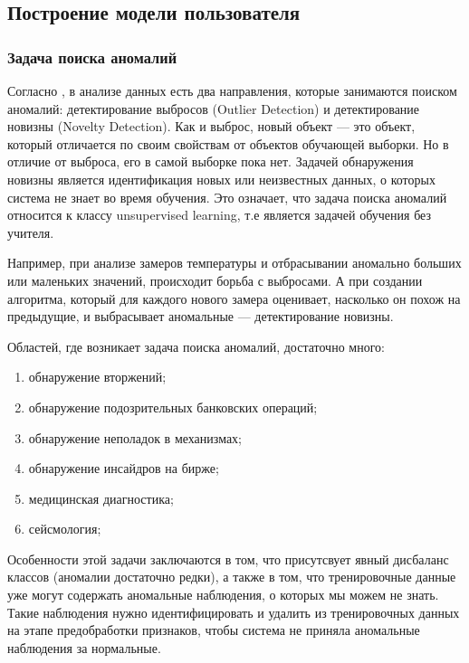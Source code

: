 \documentclass[12pt]{article}
\begin{document}
    \subsection{Построение модели пользователя}
    \label{sec:Research:Model}

    \subsubsection{Задача поиска аномалий}
    \label{sec:Research:Model:Anomaly}

    \par Согласно \cite{Dyakonov, NoveltyDetection}, в анализе данных есть два направления, которые занимаются поиском аномалий: детектирование выбросов (Outlier Detection) и детектирование новизны (Novelty Detection). Как и выброс, новый объект — это объект, который отличается по своим свойствам от объектов обучающей выборки. Но в отличие от выброса, его в самой выборке пока нет. Задачей обнаружения новизны является идентификация новых или неизвестных данных, о которых система не знает во время обучения. Это означает, что задача поиска аномалий относится к классу unsupervised learning, т.е является задачей обучения без учителя.

    \par Например, при анализе замеров температуры и отбрасывании аномально больших или маленьких значений, происходит борьба с выбросами. А при создании алгоритма, который для каждого нового замера оценивает, насколько он похож на предыдущие, и выбрасывает аномальные — детектирование новизны.

    \par Областей, где возникает задача поиска аномалий, достаточно много:

    \begin{enumerate}
        \item обнаружение вторжений;
        \item обнаружение подозрительных банковских операций;
        \item обнаружение неполадок в механизмах;
        \item обнаружение инсайдров на бирже;
        \item медицинская диагностика;
        \item сейсмология;
    \end{enumerate}

    \par Особенности этой задачи заключаются в том, что присутсвует явный дисбаланс классов (аномалии достаточно редки), а также в том, что тренировочные данные уже могут содержать аномальные наблюдения, о которых мы можем не знать. Такие наблюдения нужно идентифицировать и удалить из тренировочных данных на этапе предобработки признаков, чтобы система не приняла аномальные наблюдения за нормальные.
\end{document}
